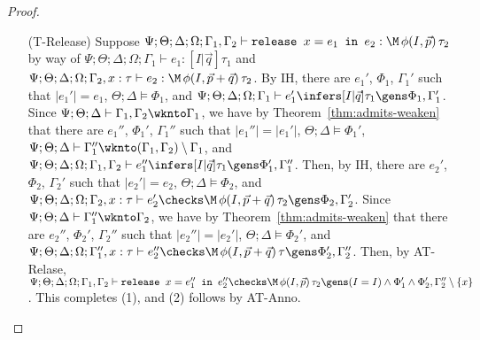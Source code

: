 \begin{proof}
\begin{itemize}
  \item[(T-Release)] Suppose
  $\Psi ; \Theta ; \Delta ; \Omega ; \Gamma_1,\Gamma_2 \vdash \texttt{release } x = e_1 \texttt{ in }e_2 : \M \, \phi(I,\vec{p}) \, \tau_2$ by way of
  $\Psi ; \Theta ; \Delta ; \Omega ; \Gamma_1 \vdash e_1 : [I | \vec{q}] \tau_1$ and
  $\Psi ; \Theta ; \Delta ; \Omega ; \Gamma_2, x : \tau \vdash e_2 : \M \, \phi(I,\vec{p} + \vec{q}) \, \tau_2$.
  By IH, there are $e_1'$, $\Phi_1$, $\Gamma_1'$ such that
  $|e_1'| = e_1$,
  $\Theta ; \Delta \vDash \Phi_1$, and
  $\Psi ; \Theta ; \Delta ; \Omega ; \Gamma_1 \vdash e_1' \infers [I|\vec{q}] \tau_1 \gens \Phi_1,\Gamma_1'$.
  Since $\Psi ; \Theta ;\Delta \vdash \Gamma_1,\Gamma_2 \wknto \Gamma_1$, we have by Theorem~\ref{thm:admits-weaken} that there are $e_1''$, $\Phi_1'$, $\Gamma_1''$ such that
  $|e_1''| = |e_1'|$,
  $\Theta ; \Delta \vDash \Phi_1'$,
  $\Psi ; \Theta ; \Delta \vdash \Gamma_1'' \wknto (\Gamma_1,\Gamma_2) \setminus \Gamma_1$, and
  $\Psi ; \Theta ; \Delta ; \Omega ; \Gamma_1,\Gamma_2 \vdash e_1'' \infers [I|\vec{q}] \tau_1 \gens \Phi_1',\Gamma_1''$.
  Then, by IH, there are $e_2'$, $\Phi_2$, $\Gamma_2'$ such that
  $|e_2'| = e_2$,
  $\Theta ; \Delta \vDash \Phi_2$, and
  $\Psi ; \Theta ; \Delta ; \Omega ; \Gamma_2, x : \tau \vdash e_2' \checks \M \, \phi(I,\vec{p} + \vec{q}) \, \tau_2 \gens \Phi_2,\Gamma_2'$.
  Since $\Psi ; \Theta ; \Delta \vdash \Gamma_1'' \wknto \Gamma_2$,
  we have by Theorem~\ref{thm:admits-weaken} that there are $e_2''$, $\Phi_2'$, $\Gamma_2''$ such that
  $|e_2''| = |e_2'|$,
  $\Theta ; \Delta \vDash \Phi_2'$, and
  $\Psi ; \Theta ; \Delta ; \Omega ; \Gamma_1'', x : \tau \vdash e_2'' \checks \M \, \phi(I,\vec{p} + \vec{q}) \, \tau \gens \Phi_2',\Gamma_2''$.
  Then, by AT-Relase,
  $\Psi ; \Theta ; \Delta ; \Omega ; \Gamma_1,\Gamma_2 \vdash \texttt{release } x = e_1'' \texttt{ in }e_2'' \checks \M \, \phi(I,\vec{p}) \, \tau_2 \gens (I = I) \wedge \Phi_1' \wedge \Phi_2',\Gamma_2'' \setminus \{x\}$.
  This completes (1), and (2) follows by AT-Anno.
  
  
  

\end{itemize}
\end{proof}
